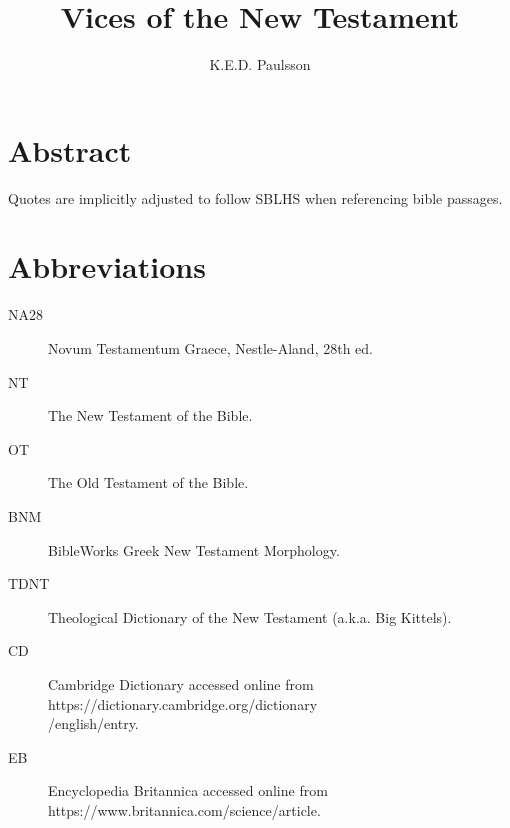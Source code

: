 \documentclass[a4paper,twocolumn,twoside,notitlepage,10pt]{article}
\title{Vices of the New Testament}
\author{K.E.D. Paulsson}
\begin{document}
\frenchspacing
\newcommand{\entlbl}[1]{\index[eng]{#1}\label{itm:#1}}
\newcommand{\entref}[1]{\emph{#1} ~($\rightarrow$~p.~\pageref{itm:#1})}
\newcommand{\entrefgls}[1]{\emph{#1}$\rightarrow$\pageref{itm:#1}}
\newcommand{\grc}[1]{\greektext{#1}\latintext}
\newcommand{\cdfoot}[2]{\footnote{\emph{CD}, s.v. ``{#1},'' accessed \printdate{#2}.}}
\newcommand{\bkfoot}[3]{\footnote{{#3}, ``{#1},'' \emph{TDNT} {#2}.}}
\newcommand{\bksfoot}[2]{\footnote{{#2}, \emph{TDNT} {#1}.}}


\newcommand{\entgls}[1]{\gls{#1} \glsdesc{#1}}



\maketitle

\section*{Abstract}

Quotes are implicitly adjusted to follow SBLHS when referencing bible passages.

\section{Abbreviations}
\begin{description}
    \item[NA28] Novum Testamentum Graece, Nestle-Aland, 28th ed.
	\item[NT] The New Testament of the Bible.
	\item[OT] The Old Testament of the Bible.
	\item[BNM] BibleWorks Greek New Testament Morphology.
	\item[TDNT] Theological Dictionary of the New Testament (a.k.a. Big Kittels).
	\item[CD] Cambridge Dictionary accessed online from https://dictionary.cambridge.org/dictionary\\/english/\textlangle entry\textrangle.
	\item[EB] Encyclopedia Britannica accessed online from https://www.britannica.com/science/\textlangle article\textrangle.
\end{description}
\end{document}
